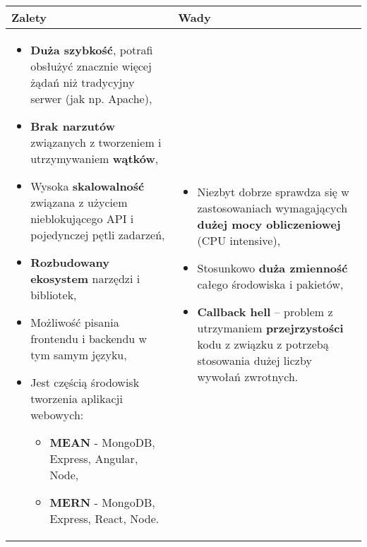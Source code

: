 \documentclass[../main.tex]{subfiles}
\begin{document}
    \begin{table}[H]
        \begin{center}
            \begin{tabular}{ p{9cm} | p{8cm} }
                \textbf{Zalety} & \textbf{Wady} \\
                \hline
                \begin{itemize}
                    \item \textbf{Duża szybkość}, potrafi obsłużyć znacznie więcej żądań niż tradycyjny serwer (jak np. Apache),
                    \item \textbf{Brak narzutów} związanych z tworzeniem i utrzymywaniem \textbf{wątków},
                    \item Wysoka \textbf{skalowalność} związana z użyciem nieblokującego API i pojedynczej pętli zadarzeń,
                    \item \textbf{Rozbudowany ekosystem} narzędzi i bibliotek,
                    \item Możliwość pisania frontendu i backendu w tym samym języku,
                    \item Jest częścią środowisk tworzenia aplikacji webowych:
                    \begin{itemize}
                        \item \textbf{MEAN} - MongoDB, Express, Angular, Node,
                        \item \textbf{MERN} - MongoDB, Express, React, Node.
                    \end{itemize}
                \end{itemize}
                &
                \begin{itemize}
                    \item Niezbyt dobrze sprawdza się w zastosowaniach wymagających \textbf{dużej mocy obliczeniowej} (CPU intensive),
                    \item Stosunkowo \textbf{duża zmienność} całego środowiska i pakietów,
                    \item \textbf{Callback hell} – problem z utrzymaniem \textbf{przejrzystości} kodu z związku z potrzebą stosowania dużej liczby wywołań zwrotnych.
                \end{itemize} \\
            \end{tabular}
        \end{center}
    \end{table}
\end{document}
